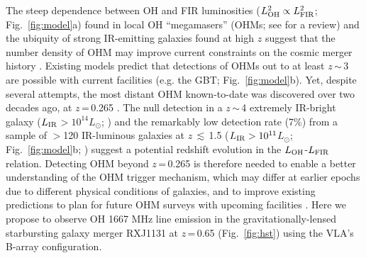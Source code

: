 \documentclass[letterpaper,11pt]{article}
\newcommand{\Lsun}{\mbox{$L_{\odot}$}\xspace}
\newcommand{\LIR}{\mbox{$L_{\rm IR}$}\xspace}
\newcommand{\LFIR}{\mbox{$L_{\rm FIR}$}\xspace}
\newcommand{\LOH}{$L_{\rm OH}$\xspace}
\newcommand{\Fig}[1]{Fig.~\ref{fig:#1}}
\newcommand{\eq}{\,=\,}
\newcommand{\ssim}{\,$\sim$\,}
\begin{document}
\noindent The steep dependence between OH and FIR luminosities ($L_{\rm OH}^2\propto L_{\rm FIR}^2$; \Fig{model}a)
found in local OH ``megamasers'' (OHMs;  see \citealt[]{Lo05a} for a review) and
the ubiquity of strong IR-emitting galaxies found at high $z$ suggest that
the number density of OHM may improve current constraints on
the cosmic merger history \citep[hereafter DG02]{Darling02b_LF}. %
Existing models predict that detections of
OHMs out to at least $z$\ssim3 are possible with current facilities (e.g. the GBT; \Fig{model}b).
Yet, despite several attempts,
the most distant OHM known-to-date was discovered over two decades ago, at $z$\eq0.265 \citep{Baan92a}.
The null detection in a $z$\ssim4 extremely IR-bright galaxy (\LIR$>10^{14}$\Lsun; \citealt{Ivison06a}) and
the remarkably low detection rate (7\%) from a sample of $>$120 IR-luminous galaxies
at $z$\,$\lesssim$\,1.5 ($L_{\rm IR}>10^{11}$\Lsun; \Fig{model}b; \citealt{Willett12a})
suggest a potential redshift evolution in the \LOH-\LFIR relation.
Detecting OHM beyond $z$\eq0.265 is therefore needed to enable a better understanding of the
OHM trigger mechanism, which may differ at earlier epochs due to different physical conditions of galaxies,
and to improve existing predictions to plan for future OHM surveys with upcoming facilities
\citep[e.g., FAST, APERTIF/WSRT, ASKAP;][]{Zhang14b}.
Here we propose to observe OH 1667 MHz line emission in the
gravitationally-lensed starbursting galaxy merger
RXJ1131 at $z$\eq0.65 (\Fig{hst}) using the VLA's B-array configuration.
\end{document}
